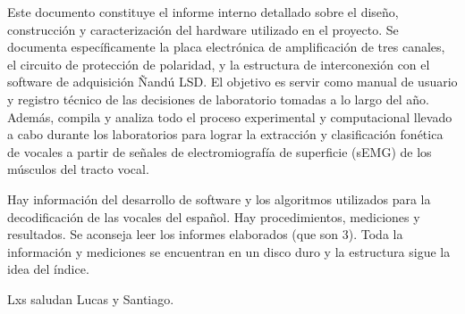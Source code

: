 \documentclass[11pt,letterpaper]{article}
\begin{document}
Este documento constituye el informe interno detallado sobre el diseño, construcción y caracterización del hardware utilizado en el proyecto. 
Se documenta específicamente la placa electrónica de amplificación de tres canales, el circuito de protección de polaridad, y la estructura de interconexión con el 
software de adquisición Ñandú LSD. El objetivo es servir como manual de usuario y registro técnico de las decisiones de laboratorio tomadas a lo largo del año. 
Además, compila y analiza todo el proceso experimental y computacional llevado a cabo durante los laboratorios para lograr la extracción y clasificación fonética 
de vocales a partir de señales de electromiografía de superficie (sEMG) de los músculos del tracto vocal.

Hay información del desarrollo de software y los algoritmos utilizados para la decodificación de las vocales del español. Hay procedimientos, mediciones y resultados.
 Se aconseja leer los informes elaborados (que son 3). Toda la información y mediciones se encuentran en un disco duro y la estructura sigue la idea del índice.

Lxs saludan Lucas y Santiago.

\newpage
{\hypersetup{linkcolor=black}
\tableofcontents}
\newpage








\printbibliography
\end{document}

